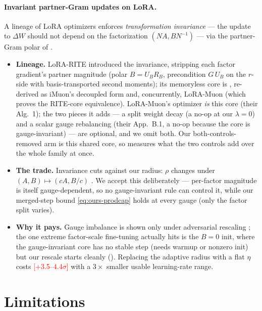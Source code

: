 \documentclass[11pt]{article}
\newcommand{\DW}{\Delta W}
\newcommand{\PLACEHOLDER}[1]{\textcolor{red}{[#1]}}
\theoremstyle{plain}
\theoremstyle{definition}
\theoremstyle{remark}
\begin{document}
\paragraph{Invariant partner-Gram updates on LoRA.} A lineage of LoRA optimizers enforces \emph{transformation invariance} --- the update to $\DW$ should not depend on the factorization $(NA,BN^{-1})$ --- via the partner-Gram polar of .
\begin{itemize}[leftmargin=1.5em,itemsep=1pt,topsep=2pt]
  \item \textbf{Lineage.} LoRA-RITE \cite{lorarite} introduced the invariance, stripping each factor gradient's partner magnitude (polar $B=U_BR_B$, precondition $G\,U_B$ on the $r$-side with basis-transported second moments); its memoryless core is , re-derived as iMuon's decoupled form \cite{imuon} and, concurrently, LoRA-Muon \cite{loramuon} (which proves the RITE-core equivalence). LoRA-Muon's optimizer \emph{is} this core (their Alg.~1); the two pieces it adds --- a split weight decay (a no-op at our $\lambda{=}0$) and a scalar gauge rebalancing (their App.~B.1, a no-op because the core is gauge-invariant) --- are optional, and we omit both. Our both-controls-removed arm is this shared core, so  measures what the two controls add over the whole family at once.
  \item \textbf{The trade.} Invariance cuts against our radius: $\rho$ changes under $(A,B)\mapsto(cA,B/c)$ \cite{loramuon}. We accept this deliberately --- per-factor magnitude is itself gauge-dependent, so no gauge-invariant rule can control it, while our merged-step bound \eqref{eq:ours-prodcap} holds at every gauge (only the factor split varies).
  \item \textbf{Why it pays.} Gauge imbalance is shown only under adversarial rescaling \cite{loramuon}; the one extreme factor-scale fine-tuning actually hits is the $B{=}0$ init, where the gauge-invariant core has no stable step (needs warmup or nonzero init) but our rescale starts cleanly (). Replacing the adaptive radius with a flat $\eta$ costs \PLACEHOLDER{+3.5--4.4$\sigma$} with a $3\times$ smaller usable learning-rate range.
\end{itemize}

\section{Limitations}
\label{sec:limitations}
\end{document}
